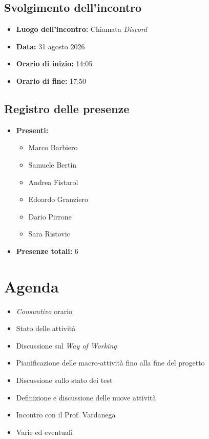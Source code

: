 \documentclass[12pt, a4paper]{article}
\begin{document}
\subsection{Svolgimento dell'incontro}
\begin{itemize}
    \item \textbf{Luogo dell'incontro:} Chiamata \textit{Discord}
    \item \textbf{Data:} 31 agosto 2026
    \item \textbf{Orario di inizio:} 14:05
    \item \textbf{Orario di fine:} 17:50
\end{itemize}

\subsection{Registro delle presenze}
\begin{itemize}
\item \textbf{Presenti:} %
\begin{itemize}
    \item Marco Barbiero
    \item Samuele Bertin
    \item Andrea Fistarol
    \item Edoardo Granziero
    \item Dario Pirrone
    \item Sara Ristovic
\end{itemize}
\item \textbf{Presenze totali:} 6
\end{itemize}


\section{Agenda}
\begin{itemize}
    \item \textit{Consuntivo} orario
    \item Stato delle attività
    \item Discussione sul \textit{Way of Working}
    \item Pianificazione delle macro-attività fino alla fine del progetto
    \item Discussione sullo stato dei test
    \item Definizione e discussione delle nuove attività
    \item Incontro con il Prof. Vardanega
    \item Varie ed eventuali
\end{itemize}
\end{document}
